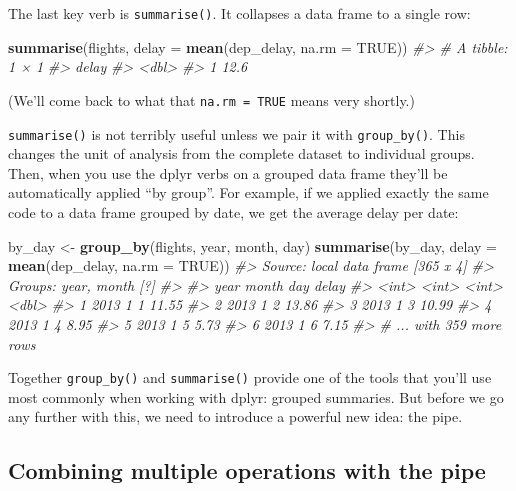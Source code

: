 \documentclass[]{book}
\newenvironment{Shaded}{\begin{snugshade}}{\end{snugshade}}
\newcommand{\KeywordTok}[1]{\textcolor[rgb]{0.13,0.29,0.53}{\textbf{{#1}}}}
\newcommand{\DataTypeTok}[1]{\textcolor[rgb]{0.13,0.29,0.53}{{#1}}}
\newcommand{\StringTok}[1]{\textcolor[rgb]{0.31,0.60,0.02}{{#1}}}
\newcommand{\CommentTok}[1]{\textcolor[rgb]{0.56,0.35,0.01}{\textit{{#1}}}}
\newcommand{\OtherTok}[1]{\textcolor[rgb]{0.56,0.35,0.01}{{#1}}}
\newcommand{\NormalTok}[1]{{#1}}
\begin{document}
The last key verb is \texttt{summarise()}. It collapses a data frame to
a single row:

\begin{Shaded}
\begin{Highlighting}[]
\KeywordTok{summarise}\NormalTok{(flights, }\DataTypeTok{delay =} \KeywordTok{mean}\NormalTok{(dep_delay, }\DataTypeTok{na.rm =} \OtherTok{TRUE}\NormalTok{))}
\CommentTok{#> # A tibble: 1 × 1}
\CommentTok{#>   delay}
\CommentTok{#>   <dbl>}
\CommentTok{#> 1  12.6}
\end{Highlighting}
\end{Shaded}

(We'll come back to what that \texttt{na.rm\ =\ TRUE} means very
shortly.)

\texttt{summarise()} is not terribly useful unless we pair it with
\texttt{group\_by()}. This changes the unit of analysis from the
complete dataset to individual groups. Then, when you use the dplyr
verbs on a grouped data frame they'll be automatically applied ``by
group''. For example, if we applied exactly the same code to a data
frame grouped by date, we get the average delay per date:

\begin{Shaded}
\begin{Highlighting}[]
\NormalTok{by_day <-}\StringTok{ }\KeywordTok{group_by}\NormalTok{(flights, year, month, day)}
\KeywordTok{summarise}\NormalTok{(by_day, }\DataTypeTok{delay =} \KeywordTok{mean}\NormalTok{(dep_delay, }\DataTypeTok{na.rm =} \OtherTok{TRUE}\NormalTok{))}
\CommentTok{#> Source: local data frame [365 x 4]}
\CommentTok{#> Groups: year, month [?]}
\CommentTok{#> }
\CommentTok{#>    year month   day delay}
\CommentTok{#>   <int> <int> <int> <dbl>}
\CommentTok{#> 1  2013     1     1 11.55}
\CommentTok{#> 2  2013     1     2 13.86}
\CommentTok{#> 3  2013     1     3 10.99}
\CommentTok{#> 4  2013     1     4  8.95}
\CommentTok{#> 5  2013     1     5  5.73}
\CommentTok{#> 6  2013     1     6  7.15}
\CommentTok{#> # ... with 359 more rows}
\end{Highlighting}
\end{Shaded}

Together \texttt{group\_by()} and \texttt{summarise()} provide one of
the tools that you'll use most commonly when working with dplyr: grouped
summaries. But before we go any further with this, we need to introduce
a powerful new idea: the pipe.

\subsection{Combining multiple operations with the
pipe}\label{combining-multiple-operations-with-the-pipe}
\end{document}
